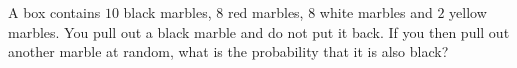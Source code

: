 A box contains $10$ black marbles, $8$ red marbles, $8$ white marbles and $2$ yellow marbles. You pull out a black marble and do not put it back. If you then pull out another marble at random, what is the probability that it is also black?
